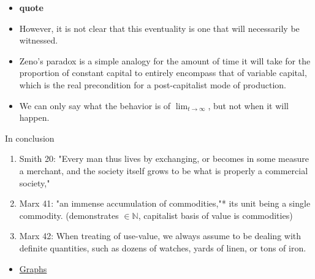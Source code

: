 \documentclass[12pt]{article}
\begin{document}
\begin{itemize}
    \item  \textbf{quote}
    \item However, it is not clear that this eventuality is one that will necessarily be witnessed.
    \item  Zeno's paradox is a simple analogy for the amount of time it will take for the proportion of constant capital to entirely encompass that of variable capital, which is the real precondition for a post-capitalist mode of production.
    \item We can only say what the behavior is of $\lim_{t \to \infty}$, but not when it will happen.


\end{itemize}
\hspace{\parindent} 

In conclusion 









\begin{enumerate}
    \item Smith 20: "Every man thus lives by exchanging, or becomes in some measure a merchant, and the society itself grows to be what is properly a commercial society,"
    \item Marx 41: "an immense accumulation of commodities,"* its unit being a single commodity. (demonstrates $\in \mathbb{N}$, capitalist basis of value is commodities)
    \item Marx 42: When treating of use-value, we always assume to be dealing with definite quantities, such as dozens of watches, yards of linen, or tons of iron.
\end{enumerate}


\begin{itemize}
    \item \href{https://en.wikipedia.org/wiki/Graph_(abstract_data_type)}{Graphs}

\end{itemize}


\end{document}
